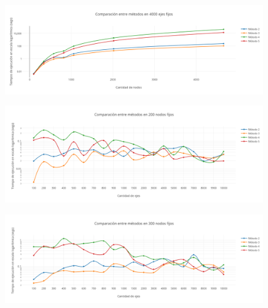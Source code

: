 \newpage
  \begin{figure}[h!]
   \begin{center}
 	\includegraphics[scale=0.5]{imagenes/local/tiempos/4000ejes.png}
   \end{center}
 \end{figure}
  
  \begin{figure}[h!]
   \begin{center}
 	\includegraphics[scale=0.5]{imagenes/local/tiempos/200nodos.png}
   \end{center}
 \end{figure}
 
  \begin{figure}[h!]
   \begin{center}
 	\includegraphics[scale=0.5]{imagenes/local/tiempos/300nodos.png}
   \end{center}
 \end{figure}
 
